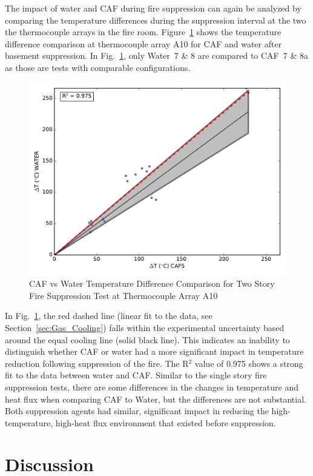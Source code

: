 \documentclass[12pt,oneside]{book}
\begin{document}
The impact of water and CAF during fire suppression can  again be analyzed by comparing the temperature differences during the suppression interval at the two the thermocouple arrays in the fire room. Figure~\ref{fig:fs_a10} shows the temperature difference comparison at thermocouple array A10 for CAF and water after basement suppression. In Fig.~\ref{fig:fs_a10}, only Water~7 \& 8 are compared to CAF~7 \& 8a as those are tests with comparable configurations.

\begin{figure}[!ht]
	\includegraphics[width=.7\columnwidth]{../Figures/Script_Figures/TC_A10_scatter}
	\caption{CAF vs Water Temperature Difference Comparison for Two Story Fire Suppression Test at Thermocouple Array A10}
	\label{fig:fs_a10}
\end{figure}

In Fig.~\ref{fig:fs_a10}, the red dashed line (linear fit to the data, see Section~\ref{sec:Gas_Cooling}) falls within the experimental uncertainty based around the equal cooling line (solid black line). This indicates an inability to distinguish whether CAF or water had a more significant impact in temperature reduction following suppression of the fire. The R$^2$ value of 0.975 shows a strong fit to the data between water and CAF. Similar to the single story fire suppression tests, there are some differences in the changes in temperature and heat flux when comparing CAF to Water, but the differences are not substantial. Both suppression agents had similar, significant impact in reducing the high-temperature, high-heat flux environment that existed before suppression. 

\chapter{Discussion}
\label{chap:Discussion}
\end{document}
